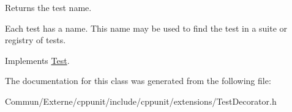 Returns the test name. 

Each test has a name. This name may be used to find the test in a suite or registry of tests. 

Implements \hyperlink{class_test_a5249569313f295a622580ffd99c9d816}{Test}.



The documentation for this class was generated from the following file\+:\begin{DoxyCompactItemize}
\item 
Commun/\+Externe/cppunit/include/cppunit/extensions/Test\+Decorator.\+h\end{DoxyCompactItemize}
